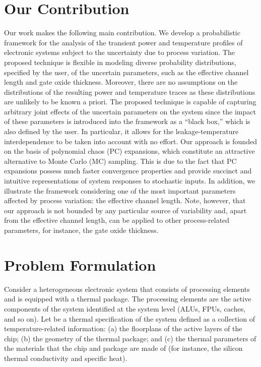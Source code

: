 \section{Our Contribution}

Our work makes the following main contribution. We develop a probabilistic
framework for the analysis of the transient power and temperature profiles of
electronic systems subject to the uncertainty due to process variation. The
proposed technique is flexible in modeling diverse probability distributions,
specified by the user, of the uncertain parameters, such as the effective
channel length and gate oxide thickness. Moreover, there are no assumptions on
the distributions of the resulting power and temperature traces as these
distributions are unlikely to be known a priori. The proposed technique is
capable of capturing arbitrary joint effects of the uncertain parameters on the
system since the impact of these parameters is introduced into the framework as
a ``black box,'' which is also defined by the user. In particular, it allows for
the leakage-temperature interdependence to be taken into account with no effort.
Our approach is founded on the basis of polynomial chaos (PC) expansions, which
constitute an attractive alternative to Monte Carlo (MC) sampling. This is due
to the fact that PC expansions possess much faster convergence properties and
provide succinct and intuitive representations of system responses to stochastic
inputs. In addition, we illustrate the framework considering one of the most
important parameters affected by process variation: the effective channel
length. Note, however, that our approach is not bounded by any particular source
of variability and, apart from the effective channel length, can be applied to
other process-related parameters, for instance, the gate oxide thickness.

\section{Problem Formulation}

Consider a heterogeneous electronic system that consists of \np processing
elements and is equipped with a thermal package. The processing elements are the
active components of the system identified at the system level (ALUs, FPUs,
caches, and so on). Let \spec be a thermal specification of the system defined
as a collection of temperature-related information: (a) the floorplans of the
active layers of the chip; (b) the geometry of the thermal package; and (c) the
thermal parameters of the materials that the chip and package are made of (for
instance, the silicon thermal conductivity and specific heat).

